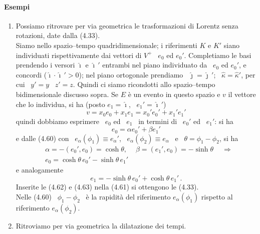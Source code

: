 \paragraph{Esempi}
\begin{enumerate}
  \item Possiamo ritrovare per via geometrica le trasformazioni di Lorentz senza
    rotazioni, date dalla (4.33).\\
    Siamo nello spazio--tempo quadridimensionale; i riferimenti $K$ e $K'$ siano
    individuati rispettivamente dai vettori di $V^+$ \ $e_0$ ed $e_0'$.
    Completiamo le basi prendendo i versori $\hat\imath$ e $\hat\imath\,'$
    entrambi nel piano individuato da \ $e_0$ ed $e_0'$, e concordi
    ($\hat\imath\cdot\hat\imath\,'>0$); nel piano ortogonale prendiamo
    \ $\hat\jmath=\hat\jmath\,'$; \ $\hat\kappa=\hat\kappa'$, per cui \ $y'=y$
    \ $z'=z$. Quindi ci siamo ricondotti allo spazio--tempo bidimensionale
    discusso sopra. Se $E$ \`e un evento in questo spazio e $v$ il vettore che
    lo individua, si ha (posto $e_1=\hat\imath$, \ $e_1'=\hat\imath\,'$)
    \begin{equation}
      v=x_0e_0+x_1e_1=x_0'e_0'+x_1'e_1'
      \tag{4.61}
    \end{equation}
    quindi dobbiamo esprimere \ $e_0$ ed \ $e_1$ \ in termini di \ $e_0'$ ed
    \ $e_1'$: si ha
    \[
      e_0=\alpha e_0'+\beta e_1'
    \]
    e dalle (4.60) con \ $e_\alpha(\phi_1)\equiv e_\alpha'$,
    \ $e_\alpha(\phi_2)\equiv e_\alpha$ \ e \ $\theta=\phi_1-\phi_2$, si ha
    \begin{equation}
      \begin{aligned}
        &\alpha=-(e_0',e_0)=\cosh\theta,
        \quad\ \beta=(e_1',e_0)=-\sinh\theta\quad\ \Rightarrow\\
        &e_0=\cosh\theta\,e_0'-\sinh\theta\,e_1'
      \end{aligned}
      \tag{4.62}
    \end{equation}
    e analogamente
    \begin{equation}
      e_1=-\sinh\theta\,e_0'+\cosh\theta\,e_1'\,.
      \tag{4.63}
    \end{equation}
    Inserite le (4.62) e (4.63) nella (4.61) si ottengono le (4.33).\\
    Nelle (4.60) \ $\phi_1-\phi_2$ \ \`e la rapidit\`a del riferimento
    $e_\alpha(\phi_1)$ rispetto al riferimento $e_\alpha(\phi_2)$.
  \item Ritroviamo per via geometrica la dilatazione dei tempi.\\

\end{enumerate}
